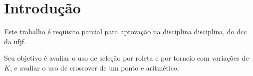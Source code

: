 \section{Introdução}

Este trabalho é requisito parcial para aprovação na disciplina \gls{disciplina}, do \gls{dcc} da \gls{ufjf}.

Seu objetivo é avaliar o uso de seleção por roleta e por torneio com variações de \(K\), e avaliar o uso de \gls{crossover} de um ponto e aritmético.